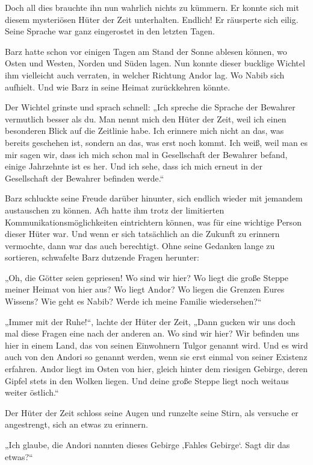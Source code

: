 Doch all dies brauchte ihn nun wahrlich nichts zu kümmern. Er konnte sich mit diesem mysteriösen Hüter der Zeit unterhalten. Endlich! Er räusperte sich eilig. Seine Sprache war ganz eingerostet in den letzten Tagen.

Barz hatte schon vor einigen Tagen am Stand der Sonne ablesen können, wo Osten und Westen, Norden und Süden lagen. Nun konnte dieser bucklige Wichtel ihm vielleicht auch verraten, in welcher Richtung Andor lag. Wo Nabib sich aufhielt. Und wie Barz in seine Heimat zurückkehren könnte.

Der Wichtel grinste und sprach schnell: „Ich spreche die Sprache der Bewahrer vermutlich besser als du. Man nennt mich den Hüter der Zeit, weil ich einen besonderen Blick auf die Zeitlinie habe. Ich erinnere mich nicht an das, was bereits geschehen ist, sondern an das, was erst noch kommt. Ich weiß, weil man es mir sagen wir, dass ich mich schon mal in Gesellschaft der Bewahrer befand, einige Jahrzehnte ist es her. Und ich sehe, dass ich mich erneut in der Gesellschaft der Bewahrer befinden werde.“

Barz schluckte seine Freude darüber hinunter, sich endlich wieder mit jemandem austauschen zu können. Aćh hatte ihm trotz der limitierten Kommunikationsmöglichkeiten eintrichtern können, was für eine wichtige Person dieser Hüter war. Und wenn er sich tatsächlich an die Zukunft zu erinnern vermochte, dann war das auch berechtigt. Ohne seine Gedanken lange zu sortieren, schwafelte Barz dutzende Fragen herunter:

„Oh, die Götter seien gepriesen! Wo sind wir hier? Wo liegt die große Steppe meiner Heimat von hier aus? Wo liegt Andor? Wo liegen die Grenzen Eures Wissens? Wie geht es Nabib? Werde ich meine Familie wiedersehen?“

„Immer mit der Ruhe!“, lachte der Hüter der Zeit, „Dann gucken wir uns doch mal diese Fragen eine nach der anderen an. Wo sind wir hier? Wir befinden uns hier in einem Land, das von seinen Einwohnern Tulgor genannt wird. Und es wird auch von den Andori so genannt werden, wenn sie erst einmal von seiner Existenz erfahren. Andor liegt im Osten von hier, gleich hinter dem riesigen Gebirge, deren Gipfel stets in den Wolken liegen. Und deine große Steppe liegt noch weitaus weiter östlich.“

Der Hüter der Zeit schloss seine Augen und runzelte seine Stirn, als versuche er angestrengt, sich an etwas zu erinnern.

„Ich glaube, die Andori nannten dieses Gebirge ‚Fahles Gebirge‘. Sagt dir das etwas?“

